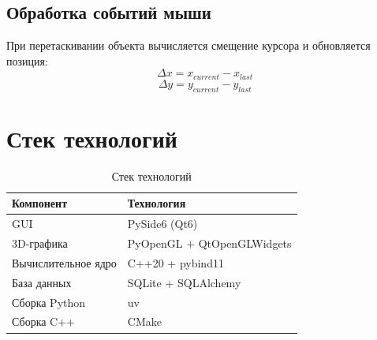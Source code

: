 \documentclass[a4paper,14pt]{extarticle}
\begin{document}
\subsection{Обработка событий мыши}
При перетаскивании объекта вычисляется смещение курсора и обновляется позиция:
\[
\Delta x = x_{current} - x_{last}
\]
\[
\Delta y = y_{current} - y_{last}
\]

\section{Стек технологий}

\begin{table}[H]
\centering
\begin{tabular}{|p{5cm}|p{8cm}|}
\hline
\textbf{Компонент} & \textbf{Технология} \\
\hline
GUI & PySide6 (Qt6) \\
\hline
3D-графика & PyOpenGL + QtOpenGLWidgets \\
\hline
Вычислительное ядро & C++20 + pybind11 \\
\hline
База данных & SQLite + SQLAlchemy \\
\hline
Сборка Python & uv \\
\hline
Сборка C++ & CMake \\
\hline
\end{tabular}
\caption{Стек технологий}
\end{table}
\end{document}
